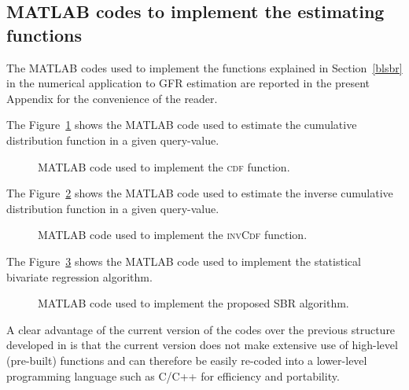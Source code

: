 \documentclass[10pt,final]{siamltex}
\begin{document}
\begin{appendix}
%
\section{MATLAB codes to implement the estimating functions}\label{appa}
%
The MATLAB codes used to implement the functions explained in Section~\ref{blsbr} in the numerical application to GFR estimation are reported in the present Appendix for the convenience of the reader.

The Figure~\ref{cdf_fun} shows the MATLAB code used to estimate the cumulative distribution function in a given query-value.
%
\begin{figure}[ht]

\caption{MATLAB code used to implement the \textsc{cdf} function.}
\label{cdf_fun}
\end{figure}
%

The Figure~\ref{invcdf_fun} shows the MATLAB code used to estimate the inverse cumulative distribution function in a given query-value.
%
\begin{figure}[ht]

\caption{MATLAB code used to implement the \textsc{invCdf} function.}
\label{invcdf_fun}
\end{figure}
%

The Figure~\ref{sbr_fun} shows the MATLAB code used to implement the statistical bivariate regression algorithm.
%
\begin{figure}[ht]

\caption{MATLAB code used to implement the proposed SBR algorithm.}
\label{sbr_fun}
\end{figure}
%

A clear advantage of the current version of the codes over the previous structure developed in \cite{fiori} is that the current version does not make extensive use of high-level (pre-built) functions and can therefore be easily re-coded into a lower-level programming language such as C/C++ for efficiency and portability.


\end{appendix}
\end{document}
